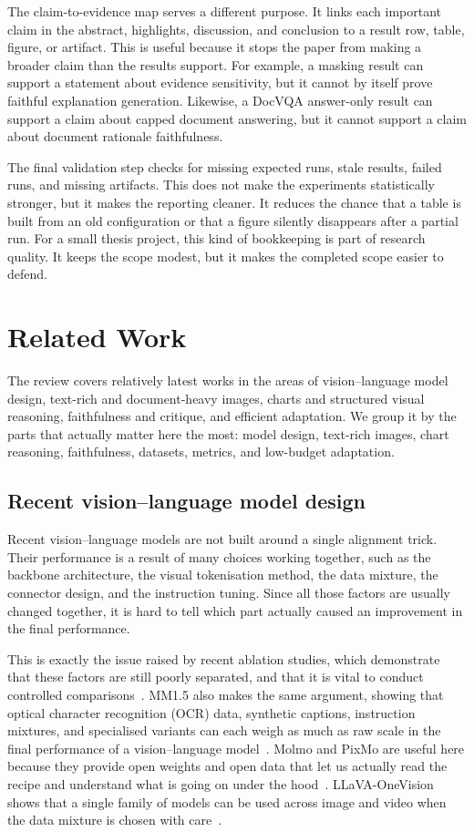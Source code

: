 \documentclass[12pt,bibliography=totoc,listof=totoc,BCOR=5mm,DIV=12,oneside,open=any]{scrbook}
\let\cite\citep
\begin{document}
The claim-to-evidence map serves a different purpose.
It links each important claim in the abstract, highlights, discussion, and conclusion to a result row, table, figure, or artifact.
This is useful because it stops the paper from making a broader claim than the results support.
For example, a masking result can support a statement about evidence sensitivity, but it cannot by itself prove faithful explanation generation.
Likewise, a DocVQA answer-only result can support a claim about capped document answering, but it cannot support a claim about document rationale faithfulness.

The final validation step checks for missing expected runs, stale results, failed runs, and missing artifacts.
This does not make the experiments statistically stronger, but it makes the reporting cleaner.
It reduces the chance that a table is built from an old configuration or that a figure silently disappears after a partial run.
For a small thesis project, this kind of bookkeeping is part of research quality.
It keeps the scope modest, but it makes the completed scope easier to defend.

\chapter{Related Work}
The review covers relatively latest works in the areas of vision--language model design,
text-rich and document-heavy images, charts and structured visual reasoning, faithfulness and critique, and efficient adaptation.
We group it by the parts that actually matter here the most: model design, text-rich images, chart reasoning, faithfulness, datasets, metrics, and low-budget adaptation.

\section{Recent vision--language model design}
Recent vision--language models are not built around a single alignment trick.
Their performance is a result of many choices working together, such as the backbone architecture,
the visual tokenisation method, the data mixture, the connector design, and the instruction tuning.
Since all those factors are usually changed together, it is hard to tell which part actually caused an improvement in the final performance.

This is exactly the issue raised by recent ablation studies, 
which demonstrate that these factors are still poorly separated, and that it is vital to conduct controlled comparisons~\cite{laurencon2024whatmatters}.
MM1.5 also makes the same argument, showing that optical character recognition (OCR) data,
synthetic captions, instruction mixtures, and specialised variants 
can each weigh as much as raw scale in the final performance of a vision--language model~\cite{zhang2025mm15}.
Molmo and PixMo are useful here because they provide open weights and open data 
that let us actually read the recipe and understand what is going on under the hood~\cite{deitke2025molmo}.
LLaVA-OneVision shows that a single family of models can be used across image and video when the data mixture is chosen with care~\cite{li2025llavaonevision}.
\end{document}
